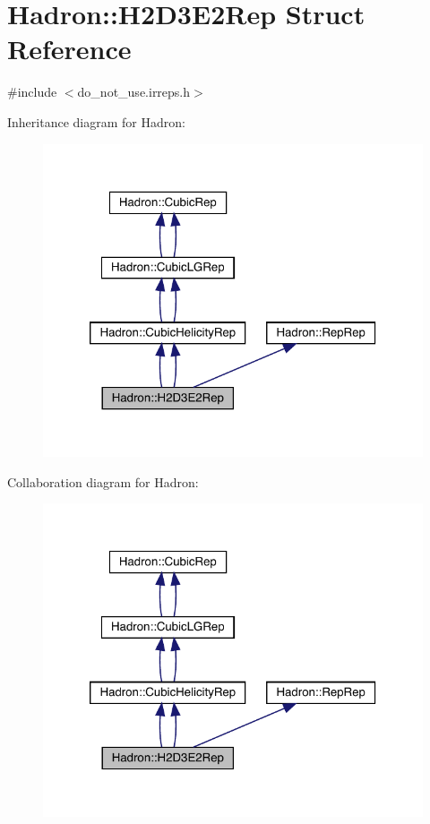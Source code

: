 \hypertarget{structHadron_1_1H2D3E2Rep}{}\section{Hadron\+:\+:H2\+D3\+E2\+Rep Struct Reference}
\label{structHadron_1_1H2D3E2Rep}


{\ttfamily \#include $<$do\+\_\+not\+\_\+use.\+irreps.\+h$>$}



Inheritance diagram for Hadron\+:\nopagebreak
\begin{figure}[H]
\begin{center}
\leavevmode
\includegraphics[width=320pt]{df/d3e/structHadron_1_1H2D3E2Rep__inherit__graph}
\end{center}
\end{figure}


Collaboration diagram for Hadron\+:\nopagebreak
\begin{figure}[H]
\begin{center}
\leavevmode
\includegraphics[width=320pt]{d9/ddc/structHadron_1_1H2D3E2Rep__coll__graph}
\end{center}
\end{figure}
